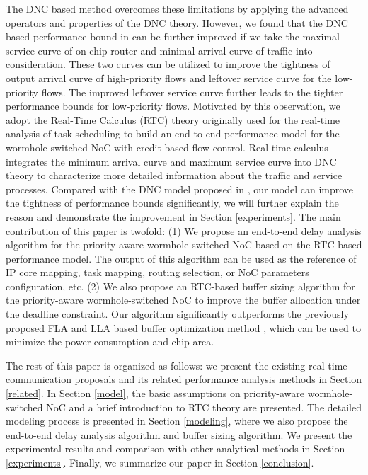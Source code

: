 \documentclass[10pt,journal]{IEEEtran}
\begin{document}
The DNC based method \cite{Qian489900} overcomes these limitations by applying the advanced operators and properties of the DNC theory. However, we found that the DNC based performance bound in \cite{Qian489900} can be further improved if we take the maximal service curve of on-chip router and minimal arrival curve of traffic into consideration. These two curves can be utilized to improve the tightness of output arrival curve of high-priority flows and leftover service curve for the low-priority flows. The improved leftover service curve further leads to the tighter performance bounds for low-priority flows. Motivated by this observation, we adopt the Real-Time Calculus (RTC) theory \cite{1253607} originally used for the real-time analysis of task scheduling to build an end-to-end performance model for the wormhole-switched NoC with credit-based flow control. Real-time calculus integrates the minimum arrival curve and maximum service curve into DNC theory to characterize more detailed information about the traffic and service processes. Compared with the DNC model proposed in \cite{Qian489900}, our model can improve the tightness of performance bounds significantly, we will further explain the reason and demonstrate the improvement in Section \ref{experiments}. The main contribution of this paper is twofold: (1) We propose an end-to-end delay analysis algorithm for the priority-aware wormhole-switched NoC based on the RTC-based performance model. The output of this algorithm can be used as the reference of IP core mapping, task mapping, routing selection, or NoC parameters configuration, etc. (2) We also propose an RTC-based buffer sizing algorithm for the priority-aware wormhole-switched NoC to improve the buffer allocation under the deadline constraint. Our algorithm significantly outperforms the previously proposed FLA and LLA based buffer optimization method \cite{189}, which can be used to minimize the power consumption and chip area.

The rest of this paper is organized as follows: we present the existing real-time communication proposals and its related performance analysis methods in Section \ref{related}. In Section \ref{model}, the basic assumptions on priority-aware wormhole-switched NoC and a brief introduction to RTC theory are presented. The detailed modeling process is presented in Section \ref{modeling}, where we also propose the end-to-end delay analysis algorithm and buffer sizing algorithm. We present the experimental results and comparison with other analytical methods in Section \ref{experiments}. Finally, we summarize our paper in Section \ref{conclusion}.
\end{document}
